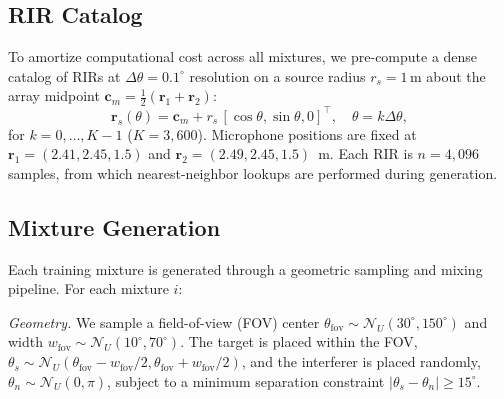 \documentclass[journal,10pt]{IEEEtran}
\newcommand{\br}{\mathbf{r}}
\newcommand{\bc}{\mathbf{c}}
\newcommand{\Ncal}{\mathcal{N}}
\begin{document}
\subsection{RIR Catalog}
To amortize computational cost across all mixtures, we pre-compute a dense catalog of RIRs at \(\Delta\theta=0.1^\circ\) resolution on a source radius \(r_s=1\,\mathrm{m}\) about the array midpoint \(\bc_m=\tfrac{1}{2}(\br_1+\br_2)\):
\begin{equation}
\br_s(\theta)=\bc_m+r_s\,[\cos\theta,\sin\theta,0]^\top,\quad\theta=k\Delta\theta,
\end{equation}
for \(k=0,\dots,K-1\) (\(K=3{,}600\)). Microphone positions are fixed at \(\br_1=(2.41,2.45,1.5)\) and \(\br_2=(2.49,2.45,1.5)\)~m. Each RIR is \(n=4{,}096\) samples, from which nearest-neighbor lookups are performed during generation.

\subsection{Mixture Generation}
Each training mixture is generated through a geometric sampling and mixing pipeline. For each mixture \(i\):

\noindent\emph{Geometry.} We sample a field-of-view (FOV) center \(\theta_{\mathrm{fov}}\!\sim\!\Ncal_U(30^\circ,150^\circ)\) and width \(w_{\mathrm{fov}}\!\sim\!\Ncal_U(10^\circ,70^\circ)\). The target is placed within the FOV, \(\theta_s\!\sim\!\Ncal_U(\theta_{\mathrm{fov}}\!-\!w_{\mathrm{fov}}/2,\theta_{\mathrm{fov}}\!+\!w_{\mathrm{fov}}/2)\), and the interferer is placed randomly, \(\theta_n\!\sim\!\Ncal_U(0,\pi)\), subject to a minimum separation constraint \(|\theta_s\!-\!\theta_n|\!\ge\!15^\circ\).
\end{document}
